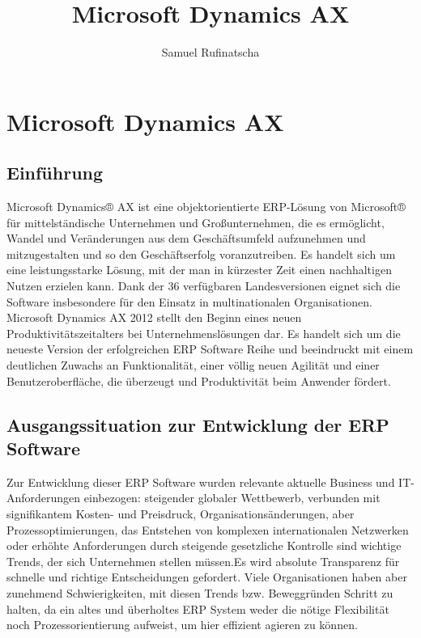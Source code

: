 
\title{Microsoft Dynamics AX}
\author{Samuel Rufinatscha}

\maketitle
\begin{sloppypar}

\section{Microsoft Dynamics AX}


\subsection{Einführung}
Microsoft Dynamics® AX ist eine objektorientierte ERP-Lösung von Microsoft® für mittelständische Unternehmen und Großunternehmen, die es ermöglicht, Wandel und Veränderungen aus dem Geschäftsumfeld aufzunehmen und mitzugestalten und so den Geschäftserfolg voranzutreiben. Es handelt sich um eine leistungsstarke Lösung, mit der man in kürzester Zeit einen nachhaltigen Nutzen erzielen kann.
Dank der 36 verfügbaren Landesversionen eignet sich die Software insbesondere für den Einsatz in multinationalen Organisationen.
Microsoft Dynamics AX 2012 stellt den Beginn eines neuen Produktivitätszeitalters bei Unternehmenslösungen dar. Es handelt sich um die neueste Version der erfolgreichen ERP Software Reihe und beeindruckt mit einem deutlichen Zuwachs an Funktionalität, einer völlig neuen Agilität und einer Benutzeroberfläche, die überzeugt und Produktivität beim Anwender fördert.


\subsection{Ausgangssituation zur Entwicklung der ERP Software}
Zur Entwicklung dieser ERP Software wurden relevante aktuelle Business und IT-Anforderungen einbezogen: steigender globaler Wettbewerb, verbunden mit signifikantem Kosten- und Preisdruck, Organisationsänderungen, aber Prozessoptimierungen, das Entstehen von komplexen internationalen Netzwerken oder erhöhte Anforderungen durch steigende gesetzliche Kontrolle sind wichtige Trends, der sich Unternehmen stellen müssen.Es wird absolute Transparenz für schnelle und richtige Entscheidungen gefordert.
Viele Organisationen haben aber zunehmend Schwierigkeiten, mit diesen Trends bzw. Beweggründen Schritt zu halten, da ein altes und überholtes ERP System weder die nötige Flexibilität noch Prozessorientierung aufweist, um hier effizient agieren zu können.



\end{sloppypar}
